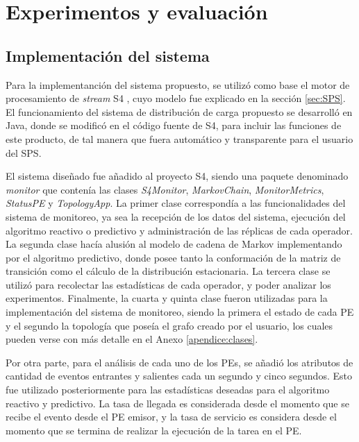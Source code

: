 \chapter{Experimentos y evaluación}
\label{cap:experimentos}

\section{Implementación del sistema}

Para la implementanción del sistema propuesto, se utilizó como base el motor de procesamiento de \textit{stream} S4 \citep{s4}, cuyo modelo fue explicado en la sección \ref{sec:SPS}. El funcionamiento del sistema de distribución de carga propuesto se desarrolló en Java, donde se modificó en el código fuente de S4, para incluir las funciones de este producto, de tal manera que fuera automático y transparente para el usuario del SPS.

El sistema diseñado fue añadido al proyecto S4, siendo una paquete denominado \textit{monitor} que contenía las clases \textit{S4Monitor}, \textit{MarkovChain}, \textit{MonitorMetrics}, \textit{StatusPE} y \textit{TopologyApp}. La primer clase correspondía a las funcionalidades del sistema de monitoreo, ya sea la recepción de los datos del sistema, ejecución del algoritmo reactivo o predictivo y administración de las réplicas de cada operador. La segunda clase hacía alusión al modelo de cadena de Markov implementando por el algoritmo predictivo, donde posee tanto la conformación de la matriz de transición como el cálculo de la distribución estacionaria. La tercera clase se utilizó para recolectar las estadísticas de cada operador, y poder analizar los experimentos. Finalmente, la cuarta y quinta clase fueron utilizadas para la implementación del sistema de monitoreo, siendo la primera el estado de cada PE y el segundo la topología que poseía el grafo creado por el usuario, los cuales pueden verse con más detalle en el Anexo \ref{apendice:clases}.

Por otra parte, para el análisis de cada uno de los PEs, se añadió los atributos de cantidad de eventos entrantes y salientes cada un segundo y cinco segundos. Esto fue utilizado posteriormente para las estadísticas deseadas para el algoritmo reactivo y predictivo. La tasa de llegada es considerada desde el momento que se recibe el evento desde el PE emisor, y la tasa de servicio es considera desde el momento que se termina de realizar la ejecución de la tarea en el PE.

